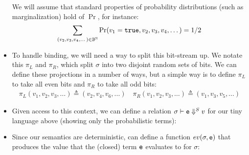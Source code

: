 \documentclass{tufte-handout}
\begin{document}
\begin{itemize}
  We will assume that standard properties of probability distributions (such as marginalization)
  hold of $\Pr$, for instance:
  \begin{align}
    \sum_{(v_2, v_3, v_4, \dots) \in \mathbb{B}^{\mathbb{N}}}\Pr(v_1 = \texttt{true}, v_2, v_3, v_4, \dots) = 1/2
  \end{align}

  \item To handle binding, we will need a way to split this bit-stream up. We notate this 
  $\pi_L$ and $\pi_R$, which split $\sigma$ into 
  two disjoint random sets of bits. We can define these projections in a number of ways, 
  but a simple way is to define $\pi_L$ to take all even bits and $\pi_R$ to take all odd bits:
  \begin{align*}
    \pi_L(v_1, v_2, v_3, \dots) \triangleq (v_2, v_4, v_6, ...) \quad 
    \pi_R(v_1, v_2, v_3, \dots) \triangleq (v_1, v_3, v_5, ...)
  \end{align*}
  
  
  \item Given access to this context, we can define a relation $\sigma \vdash
  \texttt{e} \Downarrow^S v$ for our tiny language above (showing only the probabilistic terms):

  \item Since our semantics are deterministic, can define a function $ev(\sigma, \texttt{e})$ that 
  produces the value that the (closed) term $\texttt{e}$ evaluates to for $\sigma$:
\end{itemize}
\end{document}
